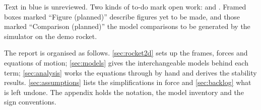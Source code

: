 Text in blue is unreviewed. Two kinds of to-do mark open work:
 and
. Framed boxes marked ``Figure (planned)''
describe figures yet to be made, and those marked ``Comparison (planned)'' the model comparisons
to be generated by the simulator on the demo rocket.

The report is organised as follows. \autoref{sec:rocket2d} sets up the frames, forces and equations
of motion; \autoref{sec:models} gives the interchangeable models behind each term;
\autoref{sec:analysis} works the equations through by hand and derives the stability results.
\autoref{sec:assumptions} lists the simplifications in force and \autoref{sec:backlog} what is left
undone. The appendix holds the notation, the model inventory and the sign conventions.
